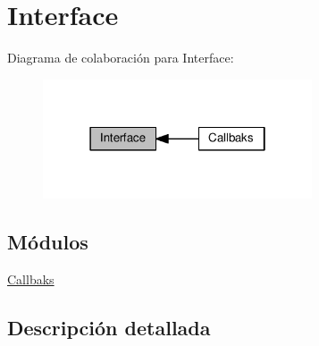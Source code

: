 \hypertarget{group__IRCInterface}{}\section{Interface}
\label{group__IRCInterface}
Diagrama de colaboración para Interface\+:\nopagebreak
\begin{figure}[H]
\begin{center}
\leavevmode
\includegraphics[width=226pt]{group__IRCInterface}
\end{center}
\end{figure}
\subsection*{Módulos}
\begin{DoxyCompactItemize}
\item 
\hyperlink{group__IRCInterfaceCallbacks}{Callbaks}
\end{DoxyCompactItemize}


\subsection{Descripción detallada}
